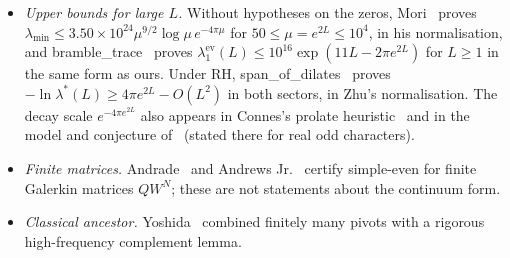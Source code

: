 \documentclass[11pt]{amsart}
\newcommand{\ev}{\mathrm{ev}}
\theoremstyle{definition}
\theoremstyle{remark}
\numberwithin{equation}{section}
\begin{document}
\begin{itemize}
\item \emph{Upper bounds for large $L$.} Without hypotheses on the zeros, Mori~\cite[Thm.~K(a)]{MoriV} proves $\lambda_{\min}\le3.50\times10^{24}\mu^{9/2}\log\mu\,e^{-4\pi\mu}$ for $50\le\mu=e^{2L}\le10^4$, in his normalisation, and bramble\_trace~\cite[Thm.~2.1]{rh25} proves $\lambda_1^\ev(L)\le10^{16}\exp(11L-2\pi e^{2L})$ for $L\ge1$ in the same form as ours. Under RH, span\_of\_dilates~\cite[Thm.~1]{rh81} proves $-\ln\lambda^*(L)\ge4\pi e^{2L}-O(L^2)$ in both sectors, in Zhu's normalisation. The decay scale $e^{-4\pi e^{2L}}$ also appears in Connes's prolate heuristic~\cite{Connes26} and in the model and conjecture of~\cite[Prop.~4.1, Conj.~4.2(a)]{rh80} (stated there for real odd characters).
\item \emph{Finite matrices.} Andrade~\cite{Andrade2} and Andrews Jr.~\cite{AndrewsJr} certify simple-even for finite Galerkin matrices $QW^N$; these are not statements about the continuum form.
\item \emph{Classical ancestor.} Yoshida~\cite{Yoshida} combined finitely many pivots with a rigorous high-frequency complement lemma.
\end{itemize}
\end{document}

